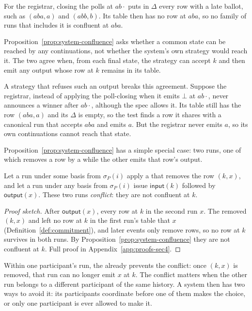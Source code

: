 For the registrar, closing the polls at $ab\cdot$ puts in $\Delta$ every row
with a late ballot, such as $(aba,a)$ and $(abb,b)$.  Its table then has no row
at $aba$, so no family of runs that includes it is confluent at $aba$.

Proposition~\ref{prop:system-confluence} asks whether a common state can be
reached by any continuations, not whether the system's own strategy would reach
it.  The two agree when, from each final state, the strategy can accept $k$ and
then emit any output whose row at $k$ remains in its table.

A strategy that refuses such an output breaks this agreement.  Suppose the
registrar, instead of applying the poll-closing \commitment when it emits
$\bot$ at $ab\cdot$, never announces a winner after $ab\cdot$, although the
spec allows it.  Its table still has the row $(aba,a)$ and its $\Delta$ is
empty, so the test finds a row it shares with a canonical run that accepts
$aba$ and emits $a$.  But the registrar never emits $a$, so its own
continuations cannot reach that state.

Proposition~\ref{prop:system-confluence} has a simple special case: two runs,
one of which removes a row by a \commitment while the other emits that row's
output.

\begin{proposition}
\label{prop:commitment-conflict}
Let a run under some \commitment basis from $\sigma_P(i)$ apply a \commitment
that removes the row $(k,x)$, and let a run under any \commitment basis from
$\sigma_P(i)$ issue $\mathsf{input}(k)$ followed by $\mathsf{output}(x)$.  These two runs
\emph{conflict}: they are not confluent at $k$.
\end{proposition}

\begin{proof}[Proof sketch]
After $\mathsf{output}(x)$, every row at $k$ in the second run \outrel $x$.
The \commitment removed $(k,x)$ and left no row at $k$ in the first run's table
that \outrel $x$ (Definition~\ref{def:commitment}), and later events only
remove rows, so no row at $k$ survives in both runs.  By
Proposition~\ref{prop:system-confluence} they are not confluent at $k$.  Full
proof in Appendix~\ref{app:proofs-sec4}.
\end{proof}

Within one participant's run, the \commitment already prevents the conflict:
once $(k,x)$ is removed, that run can no longer emit $x$ at $k$.  The conflict
matters when the other run belongs to a different participant of the same
history.  A system then has two ways to avoid it: its participants coordinate
before one of them makes the choice, or only one participant is ever allowed to
make it.

